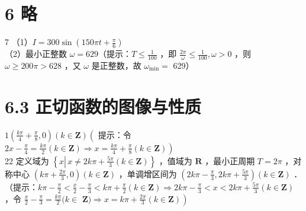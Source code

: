 \documentclass[10pt]{article}
\begin{document}
\section*{6 略}
7 （1）\(I=300 \sin \left(150 \pi t+\frac{\pi}{6}\right)\)\\
（2）最小正整数 \(\omega=629\)（提示：\(T \leqslant \frac{1}{100}\) ，即 \(\frac{2 \pi}{\omega} \leqslant \frac{1}{100}, \omega>0\) ，则 \(\omega \geqslant 200 \pi>628\) ，又 \(\omega\) 是正整数，故 \(\omega_{\min }=\) 629）

\section*{6.3 正切函数的图像与性质}
\(1\left(\frac{k \pi}{4}+\frac{\pi}{8}, 0\right)(k \in \mathbf{Z})\left(\right.\) 提示：令 \(\left.2 x-\frac{\pi}{4}=\frac{k \pi}{2}(k \in \mathbf{Z}) \Rightarrow x=\frac{k \pi}{4}+\frac{\pi}{8}(k \in \mathbf{Z})\right)\)\\
22 定义域为 \(\left\{x \left\lvert\, x \neq 2 k \pi+\frac{5 \pi}{3}(k \in \mathbf{Z})\right.\right\}\) ，值域为 \(\mathbf{R}\) ，最小正周期 \(T=2 \pi\) ，对称中心 \(\left(k \pi+\frac{2 \pi}{3}, 0\right)(k \in \mathbf{Z})\) ，单调增区间为 \(\left(2 k \pi-\frac{\pi}{3}, 2 k \pi+\frac{5 \pi}{3}\right)(k \in \mathbf{Z})\) ．\\
（提示：\(k \pi-\frac{\pi}{2}<\frac{x}{2}-\frac{\pi}{3}<k \pi+\frac{\pi}{2}(k \in \mathbf{Z}) \Rightarrow 2 k \pi-\frac{\pi}{3}<x<2 k \pi+\frac{5 \pi}{3}(k \in \mathbf{Z})\) ，令 \(\frac{x}{2}-\frac{\pi}{3}=\frac{k \pi}{2}(k \in\) \(\left.\mathbf{Z}) \Rightarrow x=k \pi+\frac{2 \pi}{3}(k \in \mathbf{Z})\right)\)
\end{document}

